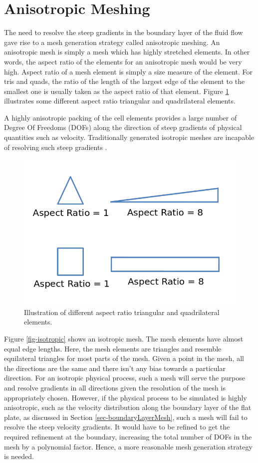 \section{Anisotropic Meshing}

The need to resolve the steep gradients in the boundary layer of the fluid flow gave rise to a mesh generation strategy called anisotropic meshing. An anisotropic mesh is simply a mesh which has highly stretched elements. In other words, the aspect ratio of the elements for an anisotropic mesh would be very high. Aspect ratio of a mesh element is simply a size measure of the element. For tris and quads, the ratio of the length of the largest edge of the element to the smallest one is usually taken as the aspect ratio of that element. Figure \ref{fig-AR} illustrates some different aspect ratio triangular and quadrilateral elements. 

A highly anisotropic packing of the cell elements provides a large number of Degree Of Freedoms (DOFs) along the direction of steep gradients of physical quantities such as velocity. Traditionally generated isotropic meshes are incapable of resolving such steep gradients \cite{frey2005anisotropic}.

\begin{figure}
	\centering
	\includegraphics[width=0.6\linewidth]{img/intro/aspectRatio.png}
	\caption{Illustration of different aspect ratio triangular and quadrilateral elements.}
	\label{fig-AR}
\end{figure}

Figure \ref{fig-isotropic} shows an isotropic mesh. The mesh elements have almost equal edge lengths. Here, the mesh elements are triangles and resemble equilateral triangles for most parts of the mesh. Given a point in the mesh, all the directions are the same and there isn't any bias towards a particular direction. For an isotropic physical process, such a mesh will serve the purpose and resolve gradients in all directions given the resolution of the mesh is appropriately chosen. However, if the physical process to be simulated is highly anisotropic, such as the velocity distribution along the boundary layer of the flat plate, as discussed in Section \ref{sec-boundaryLayerMesh}, such a mesh will fail to resolve the steep velocity gradients. It would have to be refined to get the required refinement at the boundary, increasing the total number of DOFs in the mesh by a polynomial factor. Hence, a more reasonable mesh generation strategy is needed.

